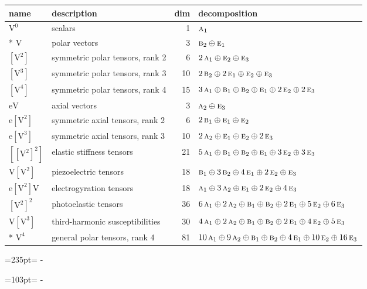\documentclass[10pt,a4paper]{article}
\newcommand{\needspace}[1]{\par\penalty-100\begingroup\dimen0=#1\relax\dimen2=\pagegoal
  \advance\dimen2-\pagetotal\ifdim\dimen0>\dimen2\relax\ifdim\dimen2>0pt\vfil\break\fi\fi
  \endgroup}
\numberwithin{equation}{section}
\newcommand{\irr}[1]{\text{\normalfont\scshape #1}}
\newcommand{\jahn}[1]{\mathrm{#1}}
\newlength{\fillwidth}\newlength{\cellwidth}\newlength{\colwidth}
\begin{document}
{\begin{longtable}{@{}llr>{\RaggedRight\arraybackslash}p{\fillwidth}@{}}
name & description & dim & decomposition\\\midrule\endhead
\bottomrule\endfoot\endlastfoot
$\jahn{V^{0}}$ & scalars & 1 & $\irr{a}_{1}$\\*
$\jahn{V}$ & polar vectors & 3 & $\irr{b}_{2} \oplus\allowbreak \irr{e}_{1}$\\
$\jahn{[V^{2}]}$ & symmetric polar tensors, rank 2 & 6 & $2\,\irr{a}_{1} \oplus\allowbreak \irr{e}_{2} \oplus\allowbreak \irr{e}_{3}$\\
$\jahn{[V^{3}]}$ & symmetric polar tensors, rank 3 & 10 & $2\,\irr{b}_{2} \oplus\allowbreak 2\,\irr{e}_{1} \oplus\allowbreak \irr{e}_{2} \oplus\allowbreak \irr{e}_{3}$\\
$\jahn{[V^{4}]}$ & symmetric polar tensors, rank 4 & 15 & $3\,\irr{a}_{1} \oplus\allowbreak \irr{b}_{1} \oplus\allowbreak \irr{b}_{2} \oplus\allowbreak \irr{e}_{1} \oplus\allowbreak 2\,\irr{e}_{2} \oplus\allowbreak 2\,\irr{e}_{3}$\\
$\jahn{eV}$ & axial vectors & 3 & $\irr{a}_{2} \oplus\allowbreak \irr{e}_{3}$\\
$\jahn{e[V^{2}]}$ & symmetric axial tensors, rank 2 & 6 & $2\,\irr{b}_{1} \oplus\allowbreak \irr{e}_{1} \oplus\allowbreak \irr{e}_{2}$\\
$\jahn{e[V^{3}]}$ & symmetric axial tensors, rank 3 & 10 & $2\,\irr{a}_{2} \oplus\allowbreak \irr{e}_{1} \oplus\allowbreak \irr{e}_{2} \oplus\allowbreak 2\,\irr{e}_{3}$\\
$\jahn{[[V^{2}]^{2}]}$ & elastic stiffness tensors & 21 & $5\,\irr{a}_{1} \oplus\allowbreak \irr{b}_{1} \oplus\allowbreak \irr{b}_{2} \oplus\allowbreak \irr{e}_{1} \oplus\allowbreak 3\,\irr{e}_{2} \oplus\allowbreak 3\,\irr{e}_{3}$\\
$\jahn{V[V^{2}]}$ & piezoelectric tensors & 18 & $\irr{b}_{1} \oplus\allowbreak 3\,\irr{b}_{2} \oplus\allowbreak 4\,\irr{e}_{1} \oplus\allowbreak 2\,\irr{e}_{2} \oplus\allowbreak \irr{e}_{3}$\\
$\jahn{e[V^{2}]V}$ & electrogyration tensors & 18 & $\irr{a}_{1} \oplus\allowbreak 3\,\irr{a}_{2} \oplus\allowbreak \irr{e}_{1} \oplus\allowbreak 2\,\irr{e}_{2} \oplus\allowbreak 4\,\irr{e}_{3}$\\
$\jahn{[V^{2}]^{2}}$ & photoelastic tensors & 36 & $6\,\irr{a}_{1} \oplus\allowbreak 2\,\irr{a}_{2} \oplus\allowbreak \irr{b}_{1} \oplus\allowbreak \irr{b}_{2} \oplus\allowbreak 2\,\irr{e}_{1} \oplus\allowbreak 5\,\irr{e}_{2} \oplus\allowbreak 6\,\irr{e}_{3}$\\
$\jahn{V[V^{3}]}$ & third-harmonic susceptibilities & 30 & $4\,\irr{a}_{1} \oplus\allowbreak 2\,\irr{a}_{2} \oplus\allowbreak \irr{b}_{1} \oplus\allowbreak \irr{b}_{2} \oplus\allowbreak 2\,\irr{e}_{1} \oplus\allowbreak 4\,\irr{e}_{2} \oplus\allowbreak 5\,\irr{e}_{3}$\\*
$\jahn{V^{4}}$ & general polar tensors, rank 4 & 81 & $10\,\irr{a}_{1} \oplus\allowbreak 9\,\irr{a}_{2} \oplus\allowbreak \irr{b}_{1} \oplus\allowbreak \irr{b}_{2} \oplus\allowbreak 4\,\irr{e}_{1} \oplus\allowbreak 10\,\irr{e}_{2} \oplus\allowbreak 16\,\irr{e}_{3}$\\
\bottomrule\end{longtable}}
\needspace{235pt}
\needspace{103pt}
\end{document}
